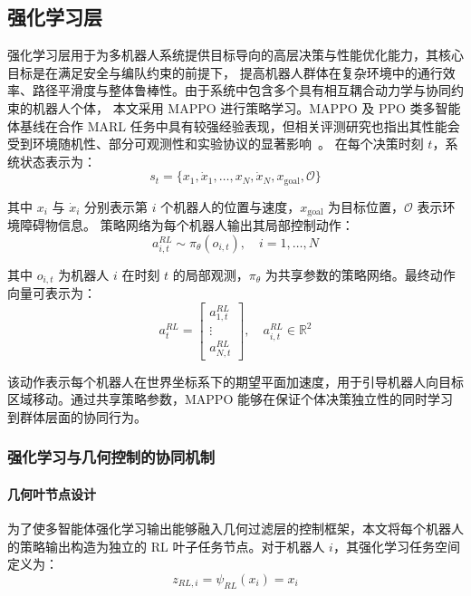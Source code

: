 \subsection{强化学习层}
强化学习层用于为多机器人系统提供目标导向的高层决策与性能优化能力，其核心目标是在满足安全与编队约束的前提下，
提高机器人群体在复杂环境中的通行效率、路径平滑度与整体鲁棒性。由于系统中包含多个具有相互耦合动力学与协同约束的机器人个体，
本文采用 MAPPO 进行策略学习。MAPPO 及 PPO 类多智能体基线在合作 MARL 任务中具有较强经验表现，但相关评测研究也指出其性能会受到环境随机性、部分可观测性和实验协议的显著影响~\cite{yu2022surprising_mappo,papoudakis2021benchmarking_marl,gorsane2022standardised_marl_eval,ellis2023smacv2}。
在每个决策时刻 $t$，系统状态表示为：
\begin{equation}
    s_t = \{x_1, \dot{x}_1, \ldots, x_N, \dot{x}_N, x_{\text{goal}}, \mathcal{O}\}
\end{equation}

其中 $x_i$ 与 $\dot{x}_i$ 分别表示第 $i$ 个机器人的位置与速度，$x_{\text{goal}}$ 为目标位置，$\mathcal{O}$ 表示环境障碍物信息。
策略网络为每个机器人输出其局部控制动作：
\begin{equation}
    a_{i,t}^{RL} \sim \pi_{\theta}(o_{i,t}), \quad i=1,\ldots,N
\end{equation}

其中 $o_{i,t}$ 为机器人 $i$ 在时刻 $t$ 的局部观测，$\pi_{\theta}$ 为共享参数的策略网络。最终动作向量可表示为：
\begin{equation}
    a_t^{RL} =
    \begin{bmatrix}
    a_{1,t}^{RL} \\
    \vdots \\
    a_{N,t}^{RL}
    \end{bmatrix},
    \quad
    a_{i,t}^{RL} \in \mathbb{R}^2
\end{equation}

该动作表示每个机器人在世界坐标系下的期望平面加速度，用于引导机器人向目标区域移动。通过共享策略参数，MAPPO 能够在保证个体决策独立性的同时学习到群体层面的协同行为。

\subsubsection{强化学习与几何控制的协同机制}
\paragraph{几何叶节点设计}
为了使多智能体强化学习输出能够融入几何过滤层的控制框架，本文将每个机器人的策略输出构造为独立的 RL 叶子任务节点。对于机器人 $i$，其强化学习任务空间定义为：
\begin{equation}
    z_{RL,i} = \psi_{RL}(x_i) = x_i
\end{equation}

